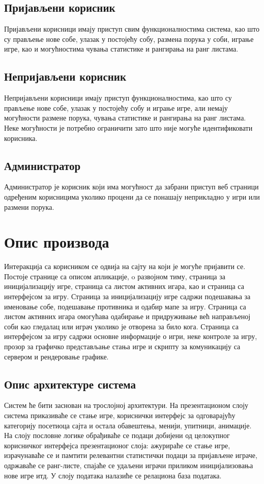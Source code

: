 \subsection{Пријављени корисник}
Пријављени корисници имају приступ свим функционалностима система, као што су прављење нове собе, улазак у
постојећу собу, размена порука у соби, играње игре, као и могућностима чувања статистике и рангирања на ранг
листама.

\subsection{Непријављени корисник}
Непријављени корисници имају приступ функционалностима, као што су прављење нове собе, улазак у постојећу собу и
играње игре, али немају могућности размене порука, чувања статистике и рангирања на ранг листама. 
Неке могућности је потребно ограничити зато што није могуће идентификовати корисника.

\subsection{Администратор}
Администратор је корисник који има могућност да забрани приступ  веб страници одређеним корисницима 
уколико процени да се понашају неприкладно у игри или размени порука.



\section{Опис производа}
Интеракција са корисником се одвија на сајту на који је могуће пријавити се. Постоје странице са описом апликације, o развојном тиму,
страница за иницијализацију игре, страница са листом активних игара, као и страница са интерфејсом за игру.
Страница за иницијализацију игре садржи подешавања за именовање собе, подешавање противника и одабир мапе за игру.
Страница са листом активних игара омогућава одабирање и придруживање већ направљеној соби као гледалац или играч
уколико је отворена за било кога. Страница са интерфејсом за игру садржи основне информације о игри, неке контроле
за игру, прозор за графичко представљање стања игре и скрипту за комуникацију са сервером и рендеровање графике.

\subsection{Опис архитектуре система}
Систем ће бити заснован на трослојној архитектури. На презентационом слоју система приказиваће се стање игре,
кориснички интерфејс за одговарајућу категорију посетиоца сајта и остала обавештења, менији, упитници, анимације.
На слоју пословне логике обрађиваће се подаци добијени од целокупног корисничког интерфејса презентационог слоја:
ажурираће се стање игре, израчунаваће се и памтити релевантни статистички подаци за пријављене играче, одржаваће
се ранг-листе, спајаће се удаљени играчи приликом иницијализовања нове игре итд. У слоју података налазиће се
релациона база података.

